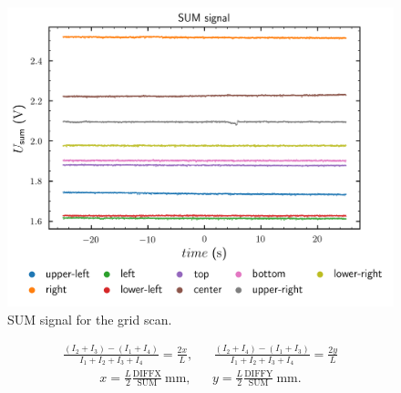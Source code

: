 \begin{figure}[htb]
	\centering
	\includegraphics{figure/plot/sum}
	\caption{SUM signal for the grid scan.}\label{fig:grid_scan_sum}
\end{figure}

\begin{align}
	\frac{(I_2+I_3)-(I_1+I_4)}{I_1+I_2+I_3+I_4}=\frac{2x}{L},
	&&
	\frac{(I_2+I_4)-(I_1+I_3)}{I_1+I_2+I_3+I_4}=\frac{2y}{L}
	\label{eq:position_conversion_photocurrent}
\end{align}
\begin{align}
	x=\frac{L}{2}\frac{\text{DIFFX}}{\text{SUM}}\ \si{\milli\meter}, &&
	y=\frac{L}{2}\frac{\text{DIFFY}}{\text{SUM}}\ \si{\milli\meter}.
	\label{eq:position_conversion_voltages}
\end{align}

